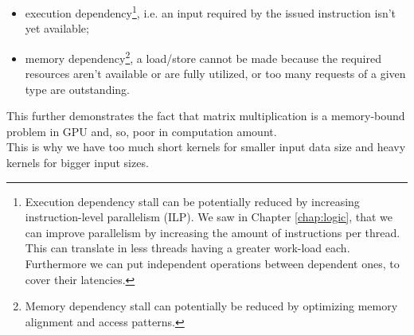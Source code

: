 \begin{itemize}
	\item execution dependency\footnote{Execution dependency stall can be potentially reduced by increasing instruction-level parallelism (ILP). We saw in Chapter \ref{chap:logic}, that we can improve parallelism by increasing the amount of instructions per thread. This can translate in less threads having a greater work-load each. Furthermore we can put independent operations between dependent ones, to cover their latencies.}, i.e. an input required by the issued instruction isn't yet available; 
	
	\item memory dependency\footnote{ Memory dependency stall can potentially be reduced by optimizing memory alignment and access patterns.}, a load/store cannot be made because the required resources aren't available or are fully utilized, or too many requests of a given type are outstanding.
\end{itemize}
This further demonstrates the fact that matrix multiplication is a memory-bound problem in GPU and, so, poor in computation amount.\\
This is why we have too much short kernels for smaller input data size and heavy kernels for bigger input sizes.



